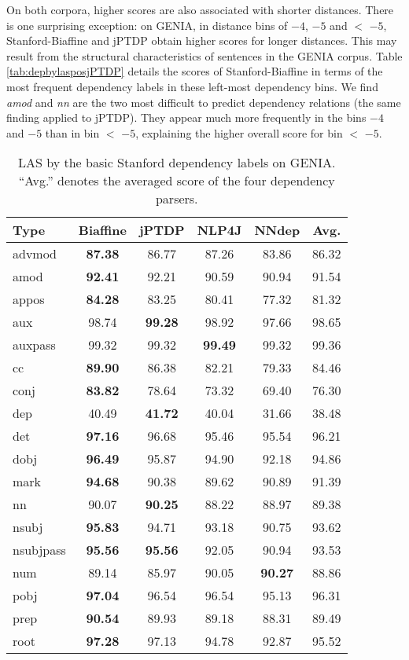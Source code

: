 \documentclass[twocolumn,hyperref]{bmcart}\pdfoutput=1
\newcommand{\CHANGEA}[1]{#1}
\begin{document}
On both corpora,  higher scores are also associated with shorter distances. There is one  surprising  exception:  on GENIA, in  
distance bins of $-4$, $-5$ and ${<}$ $-5$, Stanford-Biaffine and jPTDP obtain higher scores for longer distances.   This may result from the structural characteristics of sentences in the GENIA corpus. \CHANGEA{Table \ref{tab:depbylasposjPTDP} details the scores  of Stanford-Biaffine in terms of the most frequent dependency labels in these left-most dependency bins.}  We find \textit{amod} and \textit{nn} are the two most difficult to predict dependency relations \CHANGEA{(the same finding applied to jPTDP)}. They appear much more frequently in the bins $-4$ and $-5$ than in  bin ${<}$ $-5$, explaining the higher overall score for bin ${<}$ $-5$. 



\begin{table}[!t]
\caption{LAS  by  the basic Stanford dependency labels on GENIA. ``Avg.'' denotes the averaged score of the four dependency parsers. }
\centering
\begin{tabular}{l|c|c|c|c|c}
\hline
Type & Biaffine	& jPTDP	& NLP4J	& NNdep & Avg. \\
\hline
advmod	 & \textbf{87.38}	 & 86.77	 & 87.26	 & 83.86 & 86.32 \\
amod	 & \textbf{92.41}	 & 92.21	 & 90.59	 & 90.94 & 91.54 \\
appos & 	\textbf{84.28} & 	83.25 & 	80.41 & 	77.32 &81.32  \\
aux & 	98.74	 & \textbf{99.28} & 	98.92 & 	97.66 & 98.65 \\
auxpass & 	99.32	 & 99.32 & 	\textbf{99.49}	 & 99.32 & 99.36 \\
cc & 	\textbf{89.90}	 & 86.38 & 	82.21	 & 79.33 &84.46  \\
conj & 	\textbf{83.82}	 & 78.64	 & 73.32	 & 69.40 & 76.30 \\
dep	 & 40.49 & 	\textbf{41.72}	 & 40.04	 & 31.66 &  38.48\\
det	 & \textbf{97.16}	 & 96.68	 & 95.46 & 	95.54  &96.21 \\
dobj & 	\textbf{96.49}	 & 95.87	 & 94.90	 & 92.18  &94.86 \\
mark & \textbf{94.68}  & 90.38 & 89.62 & 90.89  & 91.39 \\
nn	 & 90.07	 & \textbf{90.25}	 & 88.22 & 	88.97 & 89.38 \\
nsubj	 & \textbf{95.83}	 & 94.71	 & 93.18	 & 90.75 & 93.62 \\
nsubjpass & 	\textbf{95.56}	 & \textbf{95.56}	 & 92.05 & 	90.94 &  93.53\\
num	 & 89.14	 & 85.97	 & {90.05} & 	\textbf{90.27} &  88.86\\
pobj	 & \textbf{97.04} & 	96.54 & 	96.54	 & 95.13 & 96.31 \\
prep & 	\textbf{90.54} & 	89.93 & 	89.18 & 	88.31 &  89.49\\
root	 & \textbf{97.28} & 	97.13 & 	94.78 & 	92.87 & 95.52 \\
\hline
\end{tabular}
\label{tab:LAS_GENIA_DepTypes}
\end{table}
\end{document}
